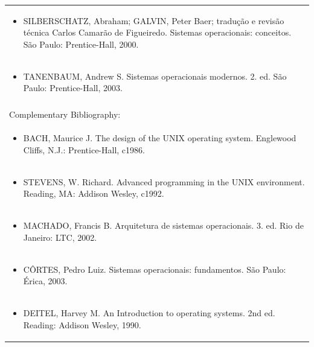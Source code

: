 \documentclass[11pt]{article}
\begin{document}
\begin{center}
\begin{longtable}{|p{4cm}|p{4cm}|p{4cm}|p{4cm}|}
\multicolumn{4}{|p{\dimexpr 16cm + 6\tabcolsep\relax}|}{\begin{itemize}\item SILBERSCHATZ, Abraham; GALVIN, Peter Baer; tradução e revisão técnica Carlos Camarão de Figueiredo. Sistemas operacionais: conceitos. São Paulo: Prentice-Hall, 2000.\end{itemize}}\\
\multicolumn{4}{|p{\dimexpr 16cm + 6\tabcolsep\relax}|}{\begin{itemize}\item TANENBAUM, Andrew S. Sistemas operacionais modernos. 2. ed. São Paulo: Prentice-Hall, 2003.\end{itemize}}\\
\multicolumn{4}{|p{16cm}|}{}\\
\hline
\multicolumn{4}{|p{16cm}|}{Complementary Bibliography:}\\*
\multicolumn{4}{|p{\dimexpr 16cm + 6\tabcolsep\relax}|}{\begin{itemize}\item BACH, Maurice J. The design of the UNIX operating system. Englewood Cliffs, N.J.: Prentice-Hall, c1986.\end{itemize}}\\
\multicolumn{4}{|p{\dimexpr 16cm + 6\tabcolsep\relax}|}{\begin{itemize}\item STEVENS, W. Richard. Advanced programming in the UNIX environment. Reading, MA: Addison Wesley, c1992.\end{itemize}}\\
\multicolumn{4}{|p{\dimexpr 16cm + 6\tabcolsep\relax}|}{\begin{itemize}\item MACHADO, Francis B. Arquitetura de sistemas operacionais. 3. ed. Rio de Janeiro: LTC, 2002.\end{itemize}}\\
\multicolumn{4}{|p{\dimexpr 16cm + 6\tabcolsep\relax}|}{\begin{itemize}\item CÔRTES, Pedro Luiz. Sistemas operacionais: fundamentos. São Paulo: Érica, 2003.\end{itemize}}\\
\multicolumn{4}{|p{\dimexpr 16cm + 6\tabcolsep\relax}|}{\begin{itemize}\item DEITEL, Harvey M. An Introduction to operating systems. 2nd ed. Reading: Addison Wesley, 1990.\end{itemize}}\\
\hline
\end{longtable}
\end{center}
\end{document}
